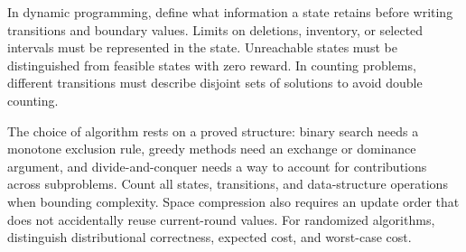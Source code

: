 In dynamic programming, define what information a state retains before writing transitions and boundary values. Limits on deletions, inventory, or selected intervals must be represented in the state. Unreachable states must be distinguished from feasible states with zero reward. In counting problems, different transitions must describe disjoint sets of solutions to avoid double counting.

The choice of algorithm rests on a proved structure: binary search needs a monotone exclusion rule, greedy methods need an exchange or dominance argument, and divide-and-conquer needs a way to account for contributions across subproblems. Count all states, transitions, and data-structure operations when bounding complexity. Space compression also requires an update order that does not accidentally reuse current-round values. For randomized algorithms, distinguish distributional correctness, expected cost, and worst-case cost.
\par\smallskip
